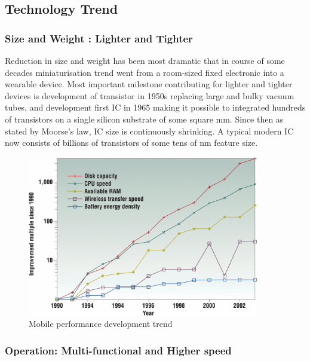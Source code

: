 \documentclass[UKenglish]{ifimaster}  %
\begin{document}
\subsection{Technology Trend}

\subsubsection{Size and Weight : Lighter and Tighter}

Reduction in size and weight has been most dramatic that in course of some decades miniaturisation trend went 
from a room-sized fixed electronic into a wearable device. Most important milestone contributing for lighter and 
tighter devices is development of transistor in 1950s replacing large and bulky vacuum tubes, and  
development first IC in 1965 making it possible to integrated hundreds of transistors on a single silicon substrate of 
some square mm. Since then as stated by Moorse's law, IC size is continuously shrinking. A typical modern IC now 
consists of billions of transistors of some  tens of nm feature size. \\

\begin{figure}[!htbp] %
   \centering
   \includegraphics[width=0.9\textwidth]{img/comp_tech_batt.png}
   \caption{Mobile performance development trend \cite{mobile_performance}}
   \label{fig:comp_tech_batt}
\end{figure}

\subsubsection{Operation: Multi-functional and Higher speed}
\end{document}
